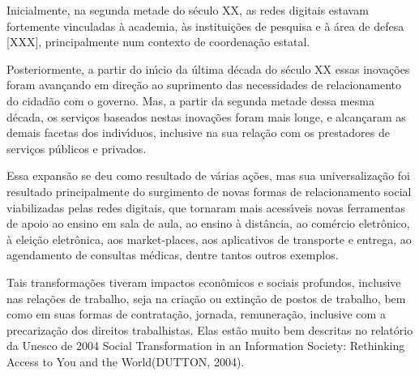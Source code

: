 \documentclass[
12pt,		%
openright,	%
twoside,  %
a4paper,			%
chapter=TITLE,		%
english,			%
french,				%
spanish,			%
brazil				%
]{USPSC-classe/USPSC}
\begin{document}
Inicialmente, na segunda metade do s\'eculo XX, as redes digitais estavam fortemente vinculadas \`a academia, \`as institui\c{c}\~oes de pesquisa e \`a \'area de defesa [XXX], principalmente num contexto de coordena\c{c}\~ao estatal.














Posteriormente, a partir do in\'{\i}cio da \'ultima d\'ecada do s\'eculo XX essas inova\c{c}\~oes  foram avan\c{c}ando em dire\c{c}\~ao ao suprimento das necessidades de relacionamento do cidad\~ao com o governo. Mas, a partir da segunda metade dessa mesma d\'ecada, os servi\c{c}os baseados nestas inova\c{c}\~oes foram mais longe, e alcan\c{c}aram  as demais facetas dos indiv\'{\i}duos, inclusive na sua rela\c{c}\~ao com os prestadores de servi\c{c}os p\'ublicos e privados.














Essa expans\~ao se deu como resultado de v\'arias a\c{c}\~oes, mas sua universaliza\c{c}\~ao foi resultado principalmente do surgimento de novas formas de relacionamento social viabilizadas pelas redes digitais, que tornaram mais acess\'{\i}veis novas ferramentas de apoio ao ensino em sala de aula, ao ensino \`a dist\^ancia, ao com\'ercio eletr\^onico, \`a elei\c{c}\~ao eletr\^onica, aos \textquotedbl market-places\textquotedbl , aos aplicativos de transporte e entrega, ao agendamento de consultas m\'edicas, dentre tantos outros exemplos.














Tais transforma\c{c}\~oes tiveram impactos econ\^omicos e sociais profundos, inclusive nas rela\c{c}\~oes de trabalho, seja na cria\c{c}\~ao ou extin\c{c}\~ao de postos de trabalho, bem como em suas formas de contrata\c{c}\~ao, jornada, remunera\c{c}\~ao, inclusive com a precariza\c{c}\~ao dos direitos trabalhistas. Elas est\~ao muito bem descritas  no relat\'orio da Unesco  de 2004 \textquotedbl Social Transformation in an Information Society: Rethinking Access to You and the World\textquotedbl  (DUTTON, 2004).
\end{document}
